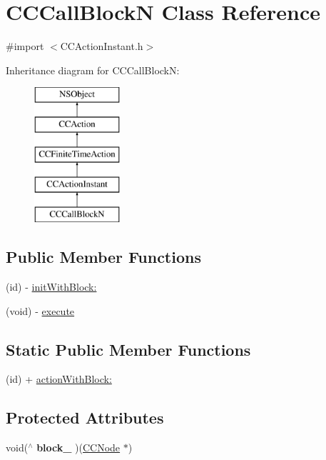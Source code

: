 \hypertarget{interface_c_c_call_block_n}{\section{C\-C\-Call\-Block\-N Class Reference}
\label{interface_c_c_call_block_n}
}


{\ttfamily \#import $<$C\-C\-Action\-Instant.\-h$>$}

Inheritance diagram for C\-C\-Call\-Block\-N\-:\begin{figure}[H]
\begin{center}
\leavevmode
\includegraphics[height=5.000000cm]{interface_c_c_call_block_n}
\end{center}
\end{figure}
\subsection*{Public Member Functions}
\begin{DoxyCompactItemize}
\item 
(id) -\/ \hyperlink{interface_c_c_call_block_n_a4e7b481a6e2fe83f02d0a333da8a6834}{init\-With\-Block\-:}
\item 
(void) -\/ \hyperlink{interface_c_c_call_block_n_aff147f233bfc4c0fee961a922c9d6110}{execute}
\end{DoxyCompactItemize}
\subsection*{Static Public Member Functions}
\begin{DoxyCompactItemize}
\item 
(id) + \hyperlink{interface_c_c_call_block_n_aaaa011162c2d5054f49582f61c2a386e}{action\-With\-Block\-:}
\end{DoxyCompactItemize}
\subsection*{Protected Attributes}
\begin{DoxyCompactItemize}
\item 
\hypertarget{interface_c_c_call_block_n_a64e6d124dc7dad1a7d3fe610b96ff51e}{void($^\wedge$ {\bfseries block\-\_\-} )(\hyperlink{class_c_c_node}{C\-C\-Node} $\ast$)}\label{interface_c_c_call_block_n_a64e6d124dc7dad1a7d3fe610b96ff51e}

\end{DoxyCompactItemize}



